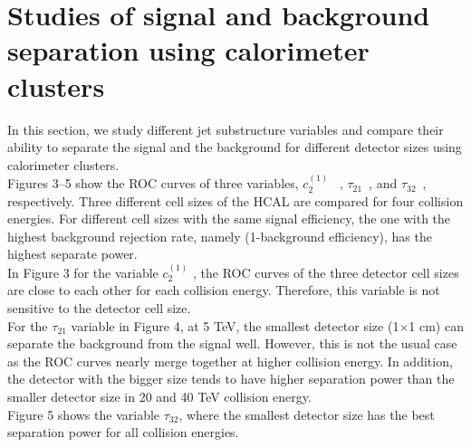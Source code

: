 \section{Studies of signal and background separation using calorimeter clusters}
In this section, we study different jet substructure variables and compare their ability to separate the signal and the background for different detector sizes using calorimeter clusters.\\

Figures 3--5 show the ROC curves of three variables, $c_2^{(1)}$~\cite{Larkoski:2013eya} , $\tau_{21}$~\cite{Thaler:2010tr}, and $\tau_{32}$~\cite{Thaler:2010tr}, respectively. Three different cell sizes of the HCAL are compared for four collision energies. For different cell sizes with the same signal efficiency, the one with the highest background rejection rate, namely (1-background efficiency), has the highest separate power.\\

In Figure 3 for the variable $c_2^{(1)}$ , the ROC curves of the three detector cell sizes are close to each other for each collision energy. Therefore, this variable is not sensitive to the detector cell size.\\

For the $\tau_{21}$ variable in Figure 4, at 5 TeV, the smallest detector size (1$\times$1 cm) can separate the background from the signal well. However, this is not the usual case as the ROC curves nearly merge together at higher collision energy. In addition, the detector with the bigger size tends to have higher separation power than the smaller detector size in 20 and 40 TeV collision energy.\\

Figure 5 shows the variable $\tau_{32}$, where the smallest detector size has the best separation power for all collision energies.\\

